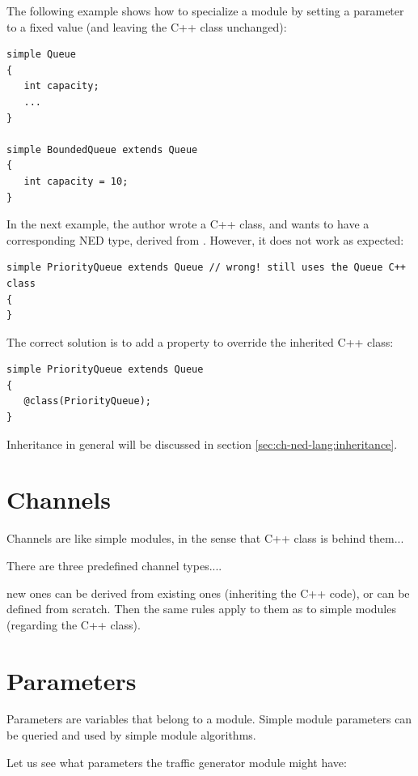 The following example shows how to specialize a module by setting a parameter
to a fixed value (and leaving the C++ class unchanged):

\begin{Verbatim}
simple Queue
{
   int capacity;
   ...
}

simple BoundedQueue extends Queue
{
   int capacity = 10;
}
\end{Verbatim}

In the next example, the author wrote a  C++ class, and
wants to have a corresponding NED type, derived from . However,
it does not work as expected:

\begin{Verbatim}
simple PriorityQueue extends Queue // wrong! still uses the Queue C++ class
{
}
\end{Verbatim}

The correct solution is to add a  property to override the
inherited C++ class:

\begin{Verbatim}
simple PriorityQueue extends Queue
{
   @class(PriorityQueue);
}
\end{Verbatim}

Inheritance in general will be discussed in section \ref{sec:ch-ned-lang:inheritance}.


\section{Channels}
\label{sec:ch-ned-lang:channels}

Channels are like simple modules, in the sense that C++ class is behind them...

There are three predefined channel types....

new ones can be derived from existing ones (inheriting the C++ code),
or can be defined from scratch. Then the same rules apply to them
as to simple modules (regarding the C++ class).


\section{Parameters}
\label{sec:ch-ned-lang:params}

Parameters are variables that belong to a module. Simple module
parameters can be queried and used by simple module algorithms.

Let us see what parameters the traffic generator  module
might have:

